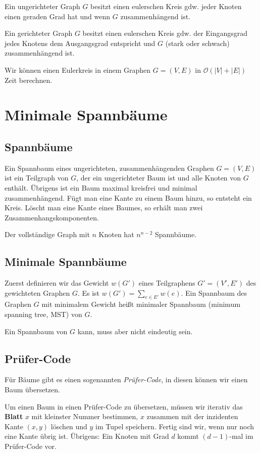 \documentclass[12pt]{article}
\begin{document}
Ein ungerichteter Graph $G$ besitzt einen eulerschen Kreis gdw. jeder Knoten einen geraden Grad hat und wenn $G$ zusammenhängend ist.

Ein gerichteter Graph $G$ besitzt einen eulerschen Kreis gdw. der Eingangsgrad jedes Knotens dem Ausgangsgrad entspricht und $G$ (stark oder schwach) zusammenhängend ist.

Wir können einen Eulerkreis in einem Graphen $G = (V, E)$ in $\mathcal O(|V| + |E|)$ Zeit berechnen.

\section{Minimale Spannbäume}

\subsection{Spannbäume}

Ein Spannbaum eines ungerichteten, zusammenhängenden Graphen $G = (V, E)$ ist ein Teilgraph von $G$, der ein ungerichteter Baum ist und alle Knoten von $G$ enthält. Übrigens ist ein Baum maximal kreisfrei und minimal zusammenhängend. Fügt man eine Kante zu einem Baum hinzu, so entsteht ein Kreis. Löscht man eine Kante eines Baumes, so erhält man zwei Zusammenhangskomponenten.

Der vollständige Graph mit $n$ Knoten hat $n^{n-2}$ Spannbäume.

\subsection{Minimale Spannbäume}

Zuerst definieren wir das Gewicht $w(G')$ eines Teilgraphens $G' = (V', E')$ des gewichteten Graphen $G$. Es ist $w(G') = \sum_{e \in E'} w(e)$. Ein Spannbaum des Graphen $G$ mit minimalem Gewicht heißt minimaler Spannbaum (minimum spanning tree, MST) von $G$.

Ein Spannbaum von $G$ kann, muss aber nicht eindeutig sein.

\subsection{Prüfer-Code}

Für Bäume gibt es einen sogenannten \textit{Prüfer-Code}, in diesen können wir einen Baum übersetzen.

Um einen Baum in einen Prüfer-Code zu übersetzen, müssen wir iterativ das \textbf{Blatt} $x$ mit kleinster Nummer bestimmen, $x$ zusammen mit der inzidenten Kante $(x, y)$ löschen und $y$ im Tupel speichern. Fertig sind wir, wenn nur noch eine Kante übrig ist. Übrigens: Ein Knoten mit Grad $d$ kommt $(d-1)$-mal im Prüfer-Code vor.
\end{document}

